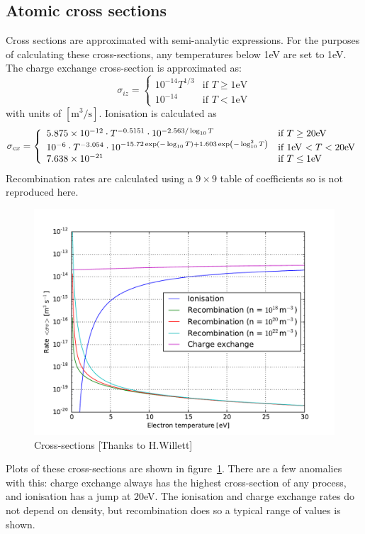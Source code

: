 \documentclass[12pt,a4paper]{article}
\begin{document}
\subsection{Atomic cross sections}

Cross sections are approximated with semi-analytic expressions. 
For the purposes of calculating these cross-sections, any temperatures below 1eV are set to 1eV. 
The charge exchange cross-section is approximated as:
\begin{equation}
  \sigma_{iz} = \left\{\begin{array}{ll}
10^{-14} T^{1/3} & \textrm{if $T \ge 1$eV} \\
10^{-14} & \textrm{if $T < 1$eV} \end{array}\right.
\end{equation}
with units of $[\textrm{m}^3/\textrm{s}]$. Ionisation is calculated as
\begin{equation}
\sigma_{cx} = \left\{\begin{array}{ll}
5.875\times 10^{-12}\cdot T^{-0.5151} \cdot 10^{-2.563/\log_{10}T} & \textrm{if $T \ge 20$eV} \\
10^{-6}\cdot T^{-3.054}\cdot 10^{-15.72\exp\left(-\log_{10}T\right) + 1.603\exp\left(-\log^2_{10}T\right)} & \textrm{if $1$eV $ < T < 20$eV} \\
7.638\times 10^{-21} & \textrm{if $T \le 1$eV}\end{array}\right.
\end{equation}
Recombination rates are calculated using a $9\times 9$ table of coefficients
so is not reproduced here.

\begin{figure}[h]
\centering
\includegraphics[width=0.7\columnwidth]{figs/hydrogen.pdf}
\caption{Cross-sections [Thanks to H.Willett]}
\label{fig:sigma}
\end{figure}
Plots of these cross-sections are shown in figure~\ref{fig:sigma}. There are a few anomalies with this: charge exchange always has the highest cross-section of any process, and ionisation has a jump at $20$eV. The ionisation and
charge exchange rates do not depend on density, but recombination does so a typical range of values is shown.
\end{document}
